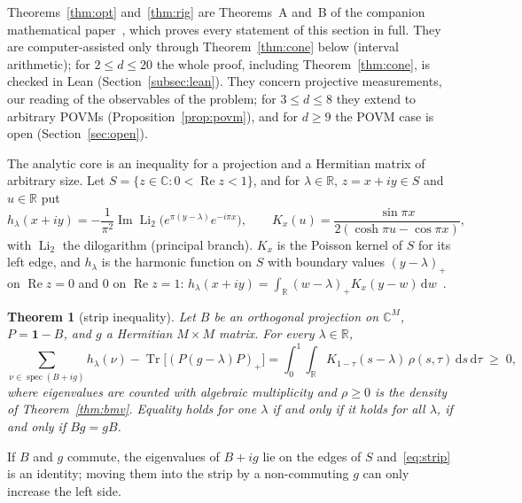 \documentclass[11pt]{article}
\newtheorem{theorem}{Theorem}
\theoremstyle{remark}
\numberwithin{equation}{section}
\newcommand{\R}{\mathbb{R}}
\newcommand{\C}{\mathbb{C}}
\newcommand{\Tr}{\operatorname{Tr}}
\newcommand{\spec}{\operatorname{spec}}
\renewcommand{\Re}{\operatorname{Re}}
\renewcommand{\Im}{\operatorname{Im}}
\newcommand{\Li}{\operatorname{Li}_2}
\newcommand{\one}{\mathbf{1}}
\newcommand{\dd}{\,\mathrm{d}}
\begin{document}
Theorems~\ref{thm:opt} and~\ref{thm:rig} are Theorems~A and~B of the companion mathematical paper~\cite{MSmath}, which
proves every statement of this section in full. They are computer-assisted only through Theorem~\ref{thm:cone} below
(interval arithmetic); for $2\le d\le20$ the whole proof, including Theorem~\ref{thm:cone}, is checked in Lean
(Section~\ref{subsec:lean}). They concern projective measurements, our reading of the observables of the problem; for
$3\le d\le8$ they extend to arbitrary POVMs (Proposition~\ref{prop:povm}), and for $d\ge9$ the POVM case is open
(Section~\ref{sec:open}).

The analytic core is an inequality for a projection and a Hermitian matrix of arbitrary size. Let
$S=\{z\in\C:0<\Re z<1\}$, and for $\lambda\in\R$, $z=x+iy\in S$ and $u\in\R$ put
\begin{equation}\label{eq:hK}
h_\lambda(x+iy)=-\frac1{\pi^2}\Im\Li\bigl(e^{\pi(y-\lambda)}e^{-i\pi x}\bigr),\qquad
K_x(u)=\frac{\sin\pi x}{2(\cosh\pi u-\cos\pi x)},
\end{equation}
with $\Li$ the dilogarithm (principal branch). $K_x$ is the Poisson kernel of $S$ for its left edge, and $h_\lambda$ is
the harmonic function on $S$ with boundary values $(y-\lambda)_+$ on $\Re z=0$ and $0$ on $\Re z=1$:
$h_\lambda(x+iy)=\int_\R(w-\lambda)_+K_x(y-w)\dd w$~\cite[Lemmas~3.1 and~3.2]{MSmath}.

\begin{theorem}[strip inequality]\label{thm:strip}
Let $B$ be an orthogonal projection on $\C^M$, $P=\one-B$, and $g$ a Hermitian $M\times M$ matrix. For every
$\lambda\in\R$,
\begin{equation}\label{eq:strip}
\sum_{\nu\in\spec(B+ig)}h_\lambda(\nu)-\Tr\bigl[(P(g-\lambda)P)_+\bigr]
=\int_0^1\!\!\int_\R K_{1-\tau}(s-\lambda)\,\rho(s,\tau)\dd s\dd\tau\;\ge\;0,
\end{equation}
where eigenvalues are counted with algebraic multiplicity and $\rho\ge0$ is the density of Theorem~\ref{thm:bmv}.
Equality holds for one $\lambda$ if and only if it holds for all $\lambda$, if and only if $Bg=gB$.
\end{theorem}

If $B$ and $g$ commute, the eigenvalues of $B+ig$ lie on the edges of $S$ and~\eqref{eq:strip} is an identity;
moving them into the strip by a non-commuting $g$ can only increase the left side.
\end{document}

